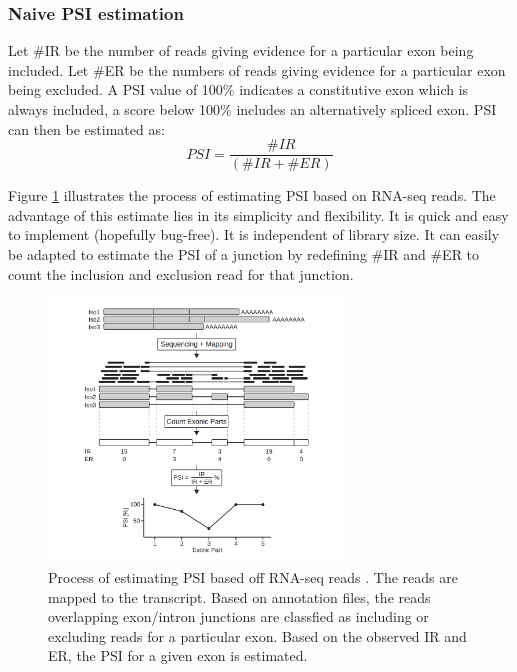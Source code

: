 \subsubsection{Naive PSI estimation}\label{subsubsec:naivepsi}

Let \#IR be the number of reads giving evidence for a particular exon being included. Let \#ER be the numbers of reads giving evidence for a particular exon being excluded. A PSI value of 100\% indicates a constitutive exon which is always included, a score below 100\% includes an alternatively spliced exon. PSI can then be estimated as:
$$PSI = \frac{\#IR}{(\#IR+\#ER)}$$

Figure \ref{fig:psiestimation} illustrates the process of estimating PSI based on RNA-seq reads.  
The advantage of this estimate lies in its simplicity and flexibility. It is quick and easy to implement (hopefully bug-free). It is independent of library size. It can easily be adapted to estimate the PSI of a junction by redefining \#IR and \#ER to count the inclusion and exclusion read for that junction.

\begin{figure}
	\centering\includegraphics[width=0.7\textwidth]{../visualizations/ch4-methods/psi_estimation.png} 
	\caption[]{
		Process of estimating PSI based off RNA-seq reads \cite{berlinpsi}. The reads are mapped to the transcript. Based on annotation files, the reads overlapping exon/intron junctions are classfied as including or excluding reads for a particular exon. Based on the observed IR and ER, the PSI for a given exon is estimated.
		}
	\label{fig:psiestimation}
\end{figure}

